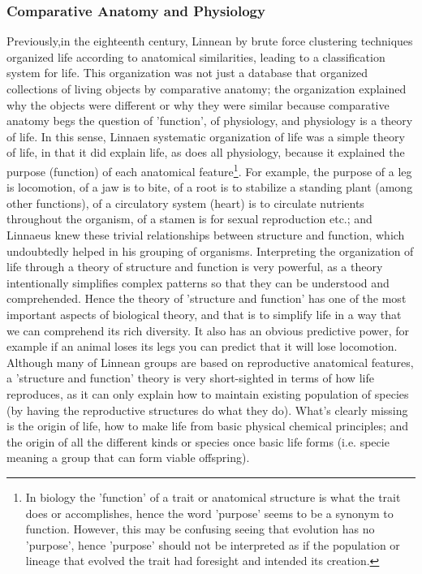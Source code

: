 \subsubsection{Comparative Anatomy and Physiology}
Previously,in the eighteenth century, Linnean by brute force clustering techniques organized life according to anatomical similarities, leading to a classification system for life. This organization was not just a database that organized collections of living objects by comparative anatomy; the organization explained why the objects were different or why they were similar because comparative anatomy begs the question of 'function', of physiology, and physiology is a theory of life.   In this sense, Linnaen systematic organization of life was a simple theory of life, in that it did explain life, as does all physiology, because it explained the purpose (function) of each anatomical feature\footnote{In biology the 'function' of a trait or anatomical structure is what the trait does or accomplishes, hence the word 'purpose' seems to be a synonym to function.  However, this may be confusing seeing that evolution has no 'purpose', hence 'purpose' should not be interpreted as if the population or lineage that evolved the trait had foresight and intended its creation.}.  For example, the purpose of a leg is locomotion, of a jaw is to bite, of a root is to stabilize a standing plant (among other functions), of a circulatory system (heart) is to circulate nutrients throughout the organism, of a stamen is for sexual reproduction etc.; and Linnaeus knew these trivial relationships between structure and function, which undoubtedly helped in his grouping of organisms.  Interpreting the organization of life through a theory of structure and function is very powerful, as a theory intentionally simplifies complex patterns so that they can be understood and comprehended.  Hence the theory of 'structure and function' has one of the most important aspects of biological theory, and that is to simplify life in a way that we can comprehend its rich diversity.  It also has an obvious predictive power, for example if an animal loses its legs you can predict that it will lose locomotion.  Although many of Linnean groups are based on reproductive anatomical features, a 'structure and function' theory is very short-sighted in terms of how life reproduces, as it can only explain how to maintain existing population of species (by having the reproductive structures do what they do).  What's clearly missing is the origin of life, how to make life from basic physical chemical principles; and the origin of all the different kinds or species once basic life forms (i.e. specie meaning a group that can form viable offspring).

